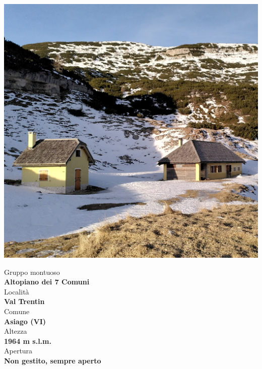 \documentclass{article}
\begin{document}
\noindent
\begin{minipage}[t]{0.45\textwidth}
  \vspace{0pt} %
  \includegraphics[width=\linewidth]{images/bivacco.jpg}
\end{minipage}%
\hfill
\begin{minipage}[t]{0.5\textwidth}
  \vspace{0pt} %
  
  Gruppo montuoso\\
  \textbf{\large Altopiano dei 7 Comuni}
  \\[1em] %
  Località\\
  \textbf{\large Val Trentin}
  \\[1em] %
  Comune\\  
  \textbf{\large Asiago (VI)}
  \\[1em] %
  Altezza\\  
  \textbf{\large 1964 m s.l.m.}
  \\[1em] %
  Apertura\\  
  \textbf{\large Non gestito, sempre aperto}

\end{minipage}
\end{document}
